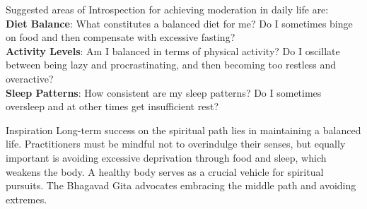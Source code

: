 



\newpage
\begin{mananam}{}
\mananamtext 
Suggested areas of Introspection for achieving moderation in daily life are:\\
\textbf{Diet Balance}: What constitutes a balanced diet for me? Do I sometimes binge on food and then compensate with excessive fasting?\\
\textbf{Activity Levels}: Am I balanced in terms of physical activity? Do I oscillate between being lazy and procrastinating, and then becoming too restless and overactive?\\
\textbf{Sleep Patterns}: How consistent are my sleep patterns? Do I sometimes oversleep and at other times get insufficient rest?
\end{mananam}
\WritingHand{}
\begin{inspiration}{\mananamfont Inspiration}
\mananamtext Long-term success on the spiritual path lies in maintaining a balanced life. Practitioners must be mindful not to overindulge their senses, but equally important is avoiding excessive deprivation through food and sleep, which weakens the body. A healthy body serves as a crucial vehicle for spiritual pursuits. The Bhagavad Gita advocates embracing the middle path and avoiding extremes.
\end{inspiration}
\newpage


